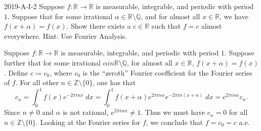 \documentclass{article}
\begin{document}
 	\begin{prb}{2019-A-I-2}
 		Suppose $f: \mathbb{R} \to \mathbb{R}$ is measurable, integrable, and periodic with period $1$. Suppose that for some irrational $\alpha \in \mathbb{R}\setminus \mathbb{Q}$, and for almost all $x \in \mathbb{R}$, we have $f(x + \alpha) = f(x)$. Show there exists a $c \in \mathbb{R}$ such that $f = c$ almost everywhere. Hint: Use Fourier Analysis. 
 	\end{prb}
 	Suppose $f: \mathbb{R} \to \mathbb{R}$ is measurable, integrable, and periodic with period $1$. Suppose further that for some irrational $\alpha in \mathbb{R}\setminus \mathbb{Q}$, for almost all $x \in \mathbb{R}$, $f(x + \alpha) = f(x)$. Define $c \coloneqq c_{0}$, where $c_{0}$ is the ``zeroth'' Fourier coefficient for the Fourier series of $f$. For all other $n \in \mathbb{Z}\setminus \{0\}$, one has that 
 	\begin{equation*}
 		c_{n} = \int_{0}^{1}f(x)e^{-2\pi i n x}\;dx = \int_{0}^{1}f(x + \alpha)e^{2\pi i n\alpha}e^{-2\pi i n (x + \alpha)}\;dx = e^{2\pi in \alpha}c_{n}. 
 	\end{equation*}
 	Since $n \neq 0$ and $\alpha$ is not rational, $e^{2\pi i n \alpha} \neq 1$. Thus we must have $c_{n} = 0$ for all $n \in \mathbb{Z}\setminus \{0\}$. Looking at the Fourier series for $f$, we conclude that $f = c_{0} = c$ a.e. 
 	
\end{document}

